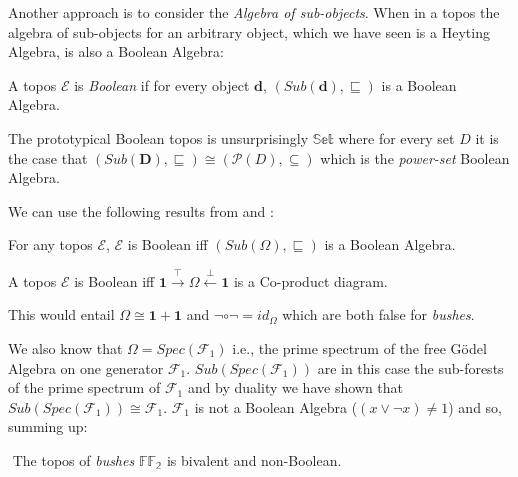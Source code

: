 	Another approach is to consider the \emph{Algebra of sub-objects}. \newline
	When in a topos the algebra of sub-objects for an arbitrary object, which we have seen is a Heyting Algebra, is also a Boolean Algebra:
	
	\begin{definition}
		A topos $\mathcal{E}$ is \emph{Boolean} if for every object $\textbf{d}$, $(Sub(\textbf{d}), \sqsubseteq)$ is a Boolean Algebra.
	\end{definition} 
	
	\begin{ex}[Sets]
		The prototypical Boolean topos is unsurprisingly $\mathbb{Set}$ where for every set $D$ it is the case that  $(Sub(\textbf{D}), \sqsubseteq) \cong (\mathcal{P}(D), \subseteq)$ which is the \emph{power-set} Boolean Algebra.
	\end{ex}
	
	We can use the following results from \cite{goldblatt} and \cite{lambekscott}:
	
	\begin{lem}
		For any topos $\mathcal{E}$, $\mathcal{E}$ is Boolean iff $(Sub(\Omega),\sqsubseteq)$ is a Boolean Algebra. 
	\end{lem}

	\begin{prop}
		A topos $\mathcal{E}$ is Boolean iff $\textbf{1} \xrightarrow{\top} \Omega \xleftarrow{\bot} \textbf{1}$ is a Co-product diagram.
	\end{prop}
	This would entail $\Omega \cong \textbf{1} + \textbf{1}$ and $\neg\circ\neg = id_\Omega$ which are both false for \emph{bushes}.\newline 

We also know that $\Omega = Spec(\mathcal{F}_1)$ i.e., the prime spectrum of the free Gödel Algebra on one generator $\mathcal{F}_1$. $Sub(Spec(\mathcal{F}_1))$ are in this case the sub-forests of the prime spectrum of $\mathcal{F}_1$ and by duality we have shown that  $Sub(Spec(\mathcal{F}_1)) \cong \mathcal{F}_1$. 
\newline
	$\mathcal{F}_1$ is not a Boolean Algebra ($(x \lor \neg x) \neq 1$) and so, summing up: 
	
	\begin{thm}
		${}$ \newline
		The topos of \emph{bushes} $\mathbb{FF_2}$ is bivalent and non-Boolean.
	\end{thm}
	
